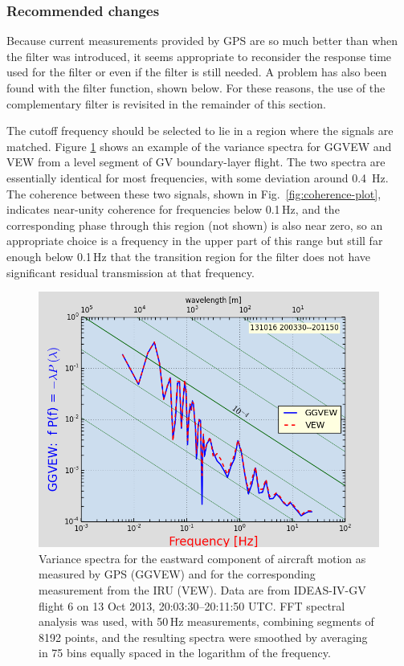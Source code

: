 \documentclass[12pt,twoside,english]{article}\usepackage[]{graphicx}\usepackage[]{color}
\makeatletter
\def\maxwidth{ %
  \ifdim\Gin@nat@width>\linewidth
    \linewidth
  \else
    \Gin@nat@width
  \fi
}
\makeatother
\begin{document}
\subsubsection{Recommended changes}

Because current measurements provided by GPS are so much better than when the filter was introduced, it seems appropriate to reconsider the response time used for the filter or even if the filter is still needed. A problem has also been found with the filter function, shown below. For these reasons, the use of the complementary filter is revisited in the remainder of this section.

The cutoff frequency should be selected to lie in a region where the signals are matched. Figure \ref{fig:FFTVEW} shows an example of the variance spectra for GGVEW and VEW from a level segment of GV boundary-layer flight. The two spectra
are essentially identical for most frequencies, with some deviation around 0.4~Hz. The coherence between these two signals, shown in Fig.~\ref{fig:coherence-plot}, indicates near-unity coherence for frequencies below 0.1\,Hz, and the corresponding phase through this region (not shown) is also near zero, so an appropriate choice is a frequency in the upper part of this range but still far enough below 0.1\,Hz that the transition region for the filter does not have significant residual transmission at that frequency.

\begin{figure}
\noindent \begin{centering}
\includegraphics[width=\maxwidth]{SpecialGraphics/FFTVEW}
\par\end{centering}
\protect\caption[Variance spectra for the eastward component of aircraft motion as measured by GPS and by IRU.]{Variance spectra for the eastward component of aircraft motion as measured by GPS (GGVEW) and for the corresponding measurement from the IRU (VEW). Data are from IDEAS-IV-GV flight 6 on 13 Oct 2013, 20:03:30--20:11:50 UTC. FFT spectral analysis was used, with 50\,Hz measurements, combining segments of 8192 points, and the resulting spectra were smoothed by averaging in 75 bins equally spaced in the logarithm of the frequency.\label{fig:FFTVEW}} 
\end{figure}
\end{document}
